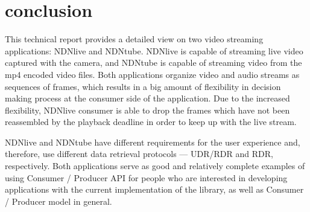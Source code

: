 \section{conclusion} %
\label{sec:conclusion}
This technical report provides a detailed view on two video streaming applications: NDNlive and NDNtube.
NDNlive is capable of streaming live video captured with the camera, and NDNtube is capable of streaming video from the mp4 encoded video files. Both applications organize video and audio streams as sequences of frames, which results in a big amount of flexibility in decision making process at the consumer side of the application. Due to the increased flexibility, NDNlive consumer is able to drop the frames which have not been reassembled by the playback deadline in order to keep up with the live stream. 

NDNlive and NDNtube have different requirements for the user experience and, therefore, use different data retrieval protocols --- UDR/RDR and RDR, respectively. Both applications serve as good and relatively complete examples of using Consumer / Producer API for people who are interested in developing applications with the current implementation of the library, as well as Consumer / Producer model in general.